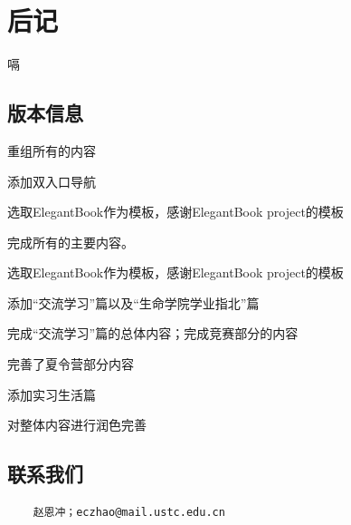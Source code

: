 \chapter*{后记}


嗝~

\section*{版本信息}

\begin{change}
  \item 重组所有的内容
  \item 添加双入口导航
\end{change}

\begin{change}
  \item 选取ElegantBook作为模板，感谢ElegantBook project的模板
  \item 完成所有的主要内容。
\end{change}



\begin{change}
  \item 选取ElegantBook作为模板，感谢ElegantBook project的模板
  \item 添加“交流学习”篇以及“生命学院学业指北”篇
  \item 完成“交流学习”篇的总体内容；完成竞赛部分的内容
  \item 完善了夏令营部分内容
\end{change}


\begin{change}
  \item 添加实习生活篇
  \item 对整体内容进行润色完善
\end{change}

\section*{联系我们}

\begin{lstlisting}
    赵恩冲；eczhao@mail.ustc.edu.cn
\end{lstlisting}
